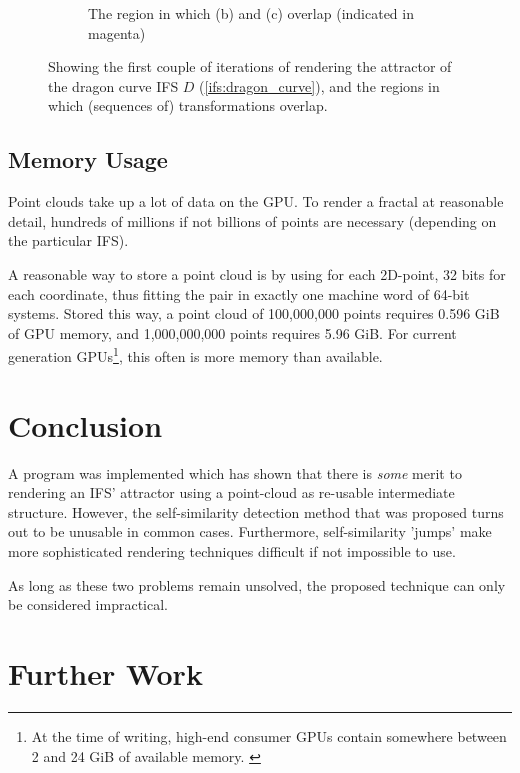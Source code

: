 \documentclass[11pt]{article}
\begin{document}
\begin{enumerate}
\begin{figure}
\begin{subfigure}[b]{0.4\textwidth}
         \caption{The region in which (b) and (c) overlap (indicated in magenta)}
         \label{figure:dragon_curve_d}
     \end{subfigure}
        \caption{Showing the first couple of iterations of rendering the attractor of the dragon curve IFS $D$ (\autoref{ifs:dragon_curve}), and the regions in which (sequences of) transformations overlap.}
        \label{figure:dragon_curve_overlaps}
\end{figure}

\end{enumerate}

\subsection{Memory Usage}
\label{sec:org8f0c896}

Point clouds take up a lot of data on the GPU. To render a fractal at reasonable detail, 
hundreds of millions if not billions of points are necessary (depending on the particular IFS).

A reasonable way to store a point cloud is by using for each 2D-point, 32 bits for each coordinate, thus fitting the pair in exactly one machine word of 64-bit systems.
Stored this way, a point cloud of 100,000,000 points requires 0.596 GiB of GPU memory,
and 1,000,000,000 points requires 5.96 GiB.
For current generation GPUs\footnote{At the time of writing, high-end consumer GPUs contain somewhere between 2 and 24 GiB of available memory. \cite{ign2020topgpus}}, this often is more memory than available.

\section{Conclusion}
\label{sec:org859e1d7}
\label{section:conclusion}

A program was implemented which has shown that there is \emph{some} merit to rendering an IFS' attractor using a point-cloud as re-usable intermediate structure.
However, the self-similarity detection method that was proposed turns out to be unusable in common cases.
Furthermore, self-similarity 'jumps' make more sophisticated rendering techniques difficult if not impossible to use.

As long as these two problems remain unsolved, the proposed technique can only be considered impractical.

\section{Further Work}
\label{sec:orge9c6be0}
\label{section:further_work}
\end{document}
